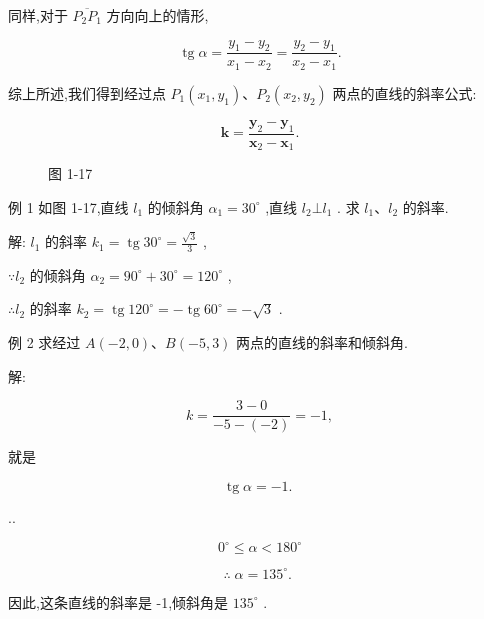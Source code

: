 \documentclass[lang=cn,newtx,10.5pt,scheme=chinese]{elegantbook}
\begin{document}
同样,对于 \(\overline{{P}_{2}{P}_{1}}\) 方向向上的情形,

\[
  \operatorname{tg}\alpha = \frac{{y}_{1} - {y}_{2}}{{x}_{1} - {x}_{2}} = \frac{{y}_{2} - {y}_{1}}{{x}_{2} - {x}_{1}}.
\]

\begin{corollary}[直线上两点的斜率公式]
综上所述,我们得到经过点 \({P}_{1}\left( {{x}_{1},{y}_{1}}\right) \text{、}{P}_{2}\left( {{x}_{2},{y}_{2}}\right)\) 两点的直线的斜率公式:

\[
  \mathbf{k} = \frac{{\mathbf{y}}_{2} - {\mathbf{y}}_{1}}{{\mathbf{x}}_{2} - {\mathbf{x}}_{1}}.
\]
\end{corollary}

\begin{figure}[h]
  \centering
  
  \caption{图 1-17}
\end{figure}



例 1 如图 1-17,直线 \({l}_{1}\) 的倾斜角 \({\alpha }_{1} = {30}^{ \circ }\) ,直线 \({l}_{2} \bot {l}_{1}\) . 求 \({l}_{1}\text{、}{l}_{2}\) 的斜率.

解: \({l}_{1}\) 的斜率 \({k}_{1} = \operatorname{tg}{30}^{ \circ } = \frac{\sqrt{3}}{3}\) ,

\(\because {l}_{2}\) 的倾斜角 \({\alpha }_{2} = {90}^{ \circ } + {30}^{ \circ } = {120}^{ \circ }\) ,

\(\therefore {l}_{2}\) 的斜率 \({k}_{2} = \operatorname{tg}{120}^{ \circ } = - \operatorname{tg}{60}^{ \circ } = - \sqrt{3}\) .

例 2 求经过 \(A\left( {-2,0}\right) \text{、}B\left( {-5,3}\right)\) 两点的直线的斜率和倾斜角.

解:

\[
  k = \frac{3 - 0}{-5 - \left( {-2}\right) } = - 1,
\]

就是

\[
  \operatorname{tg}\alpha = - 1\text{. }
\]

..

\[
    {0}^{ \circ } \leq \alpha < {180}^{ \circ }
\]

\[
  \therefore \;\alpha = {135}^{ \circ }\text{. }
\]

因此,这条直线的斜率是 -1,倾斜角是 \({135}^{ \circ }\) .
\end{document}
